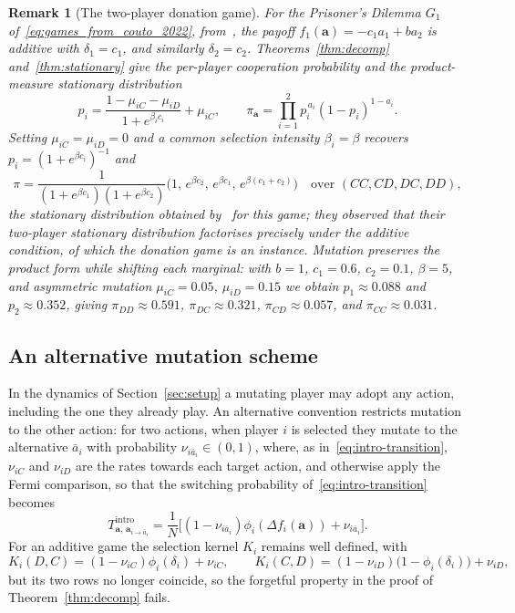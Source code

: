 \documentclass[11pt]{article}
\newtheorem{remark}{Remark}
\newcommand{\bfa}{\mathbf{a}}
\newcommand{\intro}{\mathrm{intro}}
\begin{document}
\begin{remark}[The two-player donation game]
For the Prisoner's Dilemma \(G_1\) of~\eqref{eq:games_from_couto_2022},
from~\cite{couto2022introspection}, the payoff \(f_1(\bfa)=-c_1 a_1+b a_2\) is additive
with \(\delta_1=c_1\), and similarly \(\delta_2=c_2\). Theorems~\ref{thm:decomp}
and~\ref{thm:stationary} give the per-player cooperation probability and the
product-measure stationary distribution
\[
  p_i = \frac{1-\mu_{iC}-\mu_{iD}}{1+e^{\beta_i c_i}}+\mu_{iC}, \qquad
  \pi_{\bfa} = \prod_{i=1}^{2} p_i^{\,a_i}(1-p_i)^{1-a_i}.
\]
Setting \(\mu_{iC}=\mu_{iD}=0\) and a common selection intensity \(\beta_i=\beta\)
recovers \(p_i=(1+e^{\beta c_i})^{-1}\) and
\[
  \pi = \frac{1}{(1+e^{\beta c_1})(1+e^{\beta c_2})}
        \bigl(1,\,e^{\beta c_2},\,e^{\beta c_1},\,e^{\beta(c_1+c_2)}\bigr)
  \quad\text{over } (CC,CD,DC,DD),
\]
the stationary distribution obtained by~\cite{couto2022introspection} for this game;
they
observed that their two-player stationary distribution factorises precisely under the
additive condition, of which the donation game is an instance. Mutation preserves the
product form while shifting each marginal: with \(b=1\), \(c_1=0.6\), \(c_2=0.1\),
\(\beta=5\), and asymmetric mutation \(\mu_{iC}=0.05\), \(\mu_{iD}=0.15\) we obtain
\(p_1\approx0.088\) and \(p_2\approx0.352\), giving \(\pi_{DD}\approx0.591\),
\(\pi_{DC}\approx0.321\), \(\pi_{CD}\approx0.057\), and \(\pi_{CC}\approx0.031\).
\end{remark}

\subsection{An alternative mutation scheme}\label{sec:alternative-mutation}

In the dynamics of Section~\ref{sec:setup} a mutating player may adopt any
action, including the one they already play. An alternative convention
restricts mutation to the other action: for two actions, when player \(i\)
is selected they mutate to the alternative \(\bar{a}_i\) with probability
\(\nu_{i\bar{a}_i}\in(0,1)\), where, as in~\eqref{eq:intro-transition},
\(\nu_{iC}\) and \(\nu_{iD}\) are the rates towards each target action, and
otherwise apply the Fermi comparison, so that the switching probability
of~\eqref{eq:intro-transition} becomes
\begin{equation}\label{eq:intro-transition-alternative}
  T^{\intro}_{\bfa,\,\bfa_{i\to\bar{a}_i}}
  = \frac{1}{N}\bigl[(1-\nu_{i\bar{a}_i})\phi_i(\Delta f_i(\bfa))
    +\nu_{i\bar{a}_i}\bigr].
\end{equation}
For an additive game the selection kernel \(K_i\) remains well defined,
with
\[
  K_i(D,C) = (1-\nu_{iC})\phi_i(\delta_i)+\nu_{iC}, \qquad
  K_i(C,D) = (1-\nu_{iD})\bigl(1-\phi_i(\delta_i)\bigr)+\nu_{iD},
\]
but its two rows no longer coincide, so the forgetful property in the proof
of Theorem~\ref{thm:decomp} fails.
\end{document}
